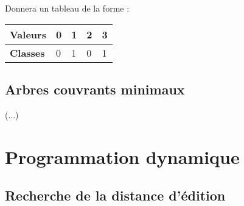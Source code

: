 \documentclass[12pt, a4paper]{report}
\begin{document}
    Donnera un tableau de la forme :

    \begin{table}[h]
    \centering
    \label{my-label}
    \begin{tabular}{|l|l|l|l|l|}
    \hline
    \textbf{Valeurs} & 0 & 1 & 2 & 3 \\ \hline
    \textbf{Classes} & 0 & 1 & 0 & 1 \\ \hline
    \end{tabular}
    \end{table}

    \section{Arbres couvrants minimaux}

    (...)

\chapter{Programmation dynamique}
    \section{Recherche de la distance d'édition}
        
\end{document}
